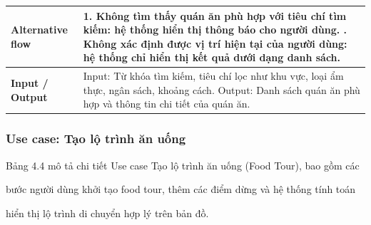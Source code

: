 \begin{longtable}{|p{4cm}|p{10cm}|}
\textbf{Alternative flow} &
1. Không tìm thấy quán ăn phù hợp với tiêu chí tìm kiếm: hệ thống hiển thị thông báo cho người dùng. \newline 2. Không xác định được vị trí hiện tại của người dùng: hệ thống chỉ hiển thị kết quả dưới dạng danh sách. \\
\hline

\textbf{Input / Output} &
Input: Từ khóa tìm kiếm, tiêu chí lọc như khu vực, loại ẩm thực, ngân sách, khoảng cách. \newline Output: Danh sách quán ăn phù hợp và thông tin chi tiết của quán ăn. \\
\hline

\end{longtable}
\endgroup



\subsubsection{Use case: Tạo lộ trình ăn uống}

Bảng 4.4 mô tả chi tiết Use case Tạo lộ trình ăn uống (Food Tour), bao gồm các

bước người dùng khởi tạo food tour, thêm các điểm dừng và hệ thống tính toán

hiển thị lộ trình di chuyển hợp lý trên bản đồ.


